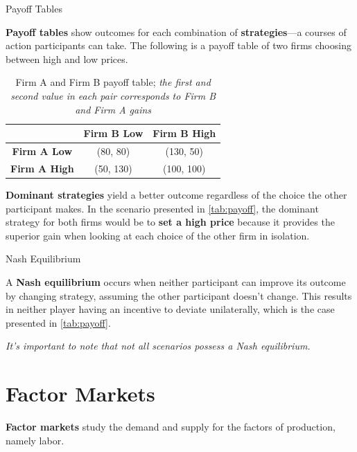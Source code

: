 \documentclass[10pt]{article}
\begin{document}
  \begin{core}[label=core:payoff]{Payoff Tables}

    \textbf{Payoff tables} show outcomes for each combination of \textbf{strategies}---a courses of action participants can take. The following is a payoff table of two firms choosing between high and low prices.

    \begin{table}[H]
      \centering
      \begin{tabular}{c|c|c|}
        & \textbf{Firm B Low} & \textbf{Firm B High} \\
        \hline
        \textbf{Firm A Low} & (80, 80) & (130, 50) \\
        \hline
        \textbf{Firm A High} & (50, 130) & (100, 100) \\
      \end{tabular}
      \caption{Firm A and Firm B payoff table; \textit{the first and second value in each pair corresponds to Firm B and Firm A gains}}
      \label{tab:payoff}
    \end{table}

    \textbf{Dominant strategies} yield a better outcome regardless of the choice the other participant makes. In the scenario presented in \autoref{tab:payoff}, the dominant strategy for both firms would be to \textbf{set a high price} because it provides the superior gain when looking at each choice of the other firm in isolation.

  \end{core}

  \begin{core}{Nash Equilibrium}

    A \textbf{Nash equilibrium} occurs when neither participant can improve its outcome by changing strategy, assuming the other participant doesn't change. This results in neither player having an incentive to deviate unilaterally, which is the case presented in \autoref{tab:payoff}.

    \textit{It's important to note that not all scenarios possess a Nash equilibrium.}

  \end{core}

\section{Factor Markets}

  \textbf{Factor markets} study the demand and supply for the factors of production, namely labor.
\end{document}
